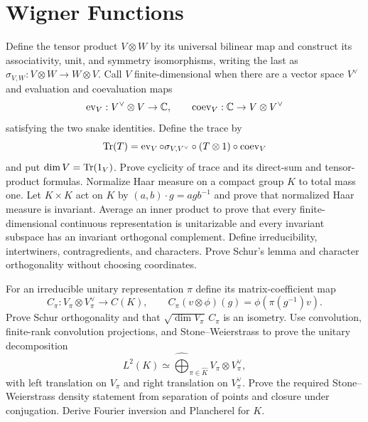 \section{Wigner Functions}

\begin{exercise}
Define the tensor product $V\otimes W$ by its universal bilinear map and
construct its associativity, unit, and symmetry isomorphisms, writing the
last as $\sigma_{V,W}:V\otimes W\to W\otimes V$.  Call $V$ finite-dimensional
when there are a vector space $V^\vee$ and evaluation
and coevaluation maps
\[
 \operatorname{ev}_V:V^\vee\otimes V\to\mathbb C,
 \qquad \operatorname{coev}_V:\mathbb C\to V\otimes V^\vee
\]
satisfying the two snake identities.  Define the trace by
\[
\operatorname{Tr}(T)=\operatorname{ev}_V\circ\sigma_{V,V^\vee}\circ
 (T\otimes1)\circ\operatorname{coev}_V
\]
and put $\dim V=\operatorname{Tr}(1_V)$.  Prove cyclicity of trace and its direct-sum and
tensor-product formulas.
Normalize Haar measure on a compact group $K$ to total mass one.  Let
$K\times K$ act on $K$ by
$(a,b)\mathbin\cdot g=agb^{-1}$ and prove that normalized Haar measure is
invariant.  Average an
inner product to prove that every finite-dimensional continuous
representation is unitarizable and every invariant subspace has an invariant
orthogonal complement.  Define irreducibility, intertwiners, contragredients,
and characters.  Prove Schur's lemma and character orthogonality without
choosing coordinates.
\end{exercise}

\begin{exercise}
For an irreducible unitary representation $\pi$ define its matrix-coefficient
map
\[
 C_\pi:V_\pi\otimes V_\pi^\vee\longrightarrow C(K),
 \qquad C_\pi(v\otimes\phi)(g)=\phi(\pi(g^{-1})v).
\]
Prove Schur orthogonality and that $\sqrt{\dim V_\pi}\,C_\pi$ is an isometry.
Use convolution, finite-rank convolution projections, and Stone--Weierstrass to
prove the unitary decomposition
\[
 L^2(K)\simeq\widehat\bigoplus_{\pi\in\widehat K}
 V_\pi\otimes V_\pi^\vee,
\]
with left translation on $V_\pi$ and right translation on $V_\pi^\vee$.
Prove the required Stone--Weierstrass density statement from separation of
points and closure under conjugation.  Derive Fourier inversion and
Plancherel for $K$.
\end{exercise}

